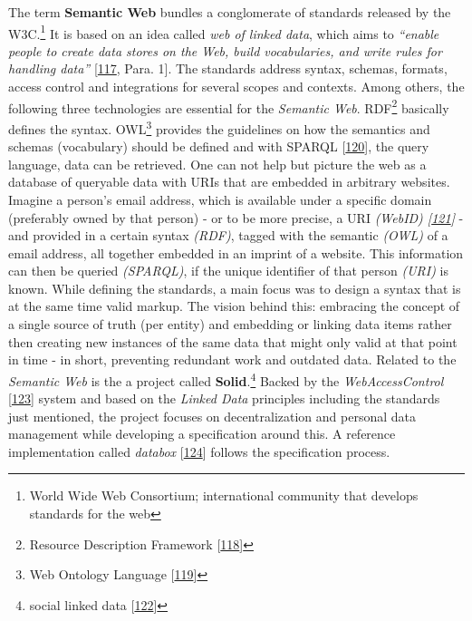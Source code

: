 \documentclass[12pt,english,a4paper,titlepage,cleardoublepage=empty,dottedtoc]{report}
\begin{document}
The term \textbf{\protect\hypertarget{def--semantic-web}{}{Semantic
Web}} bundles a conglomerate of standards released by the W3C.\footnote{World
  Wide Web Consortium; international community that develops standards
  for the web} It is based on an idea called \emph{web of linked data},
which aims to \emph{``enable people to create data stores on the Web,
build vocabularies, and write rules for handling data''}
{[}\protect\hyperlink{ref-web_2016_w3c_semantic-web-activity}{117},
Para. 1{]}. The standards address syntax, schemas, formats, access
control and integrations for several scopes and contexts. Among others,
the following three technologies are essential for the \emph{Semantic
Web}. RDF\footnote{Resource Description Framework
  {[}\protect\hyperlink{ref-web_w3c-tr_rdf}{118}{]}} basically defines
the syntax. OWL\footnote{Web Ontology Language
  {[}\protect\hyperlink{ref-web_w3c-tr_owl}{119}{]}} provides the
guidelines on how the semantics and schemas (vocabulary) should be
defined and with \protect\hypertarget{def--sparql}{}{SPARQL}
{[}\protect\hyperlink{ref-web_w3c-tr_sparql}{120}{]}, the query
language, data can be retrieved. One can not help but picture the web as
a database of queryable data with URIs that are embedded in arbitrary
websites. Imagine a person's email address, which is available under a
specific domain (preferably owned by that person) - or to be more
precise, a URI \emph{(WebID)
{[}\protect\hyperlink{ref-web_w3c-draft_webid}{121}{]}} - and provided
in a certain syntax \emph{(RDF)}, tagged with the semantic \emph{(OWL)}
of a email address, all together embedded in an imprint of a website.
This information can then be queried \emph{(SPARQL)}, if the unique
identifier of that person \emph{(URI)} is known. While defining the
standards, a main focus was to design a syntax that is at the same time
valid markup. The vision behind this: embracing the concept of a single
source of truth (per entity) and embedding or linking data items rather
then creating new instances of the same data that might only valid at
that point in time - in short, preventing redundant work and outdated
data. Related to the \emph{Semantic Web} is the a project called
\textbf{Solid}.\footnote{social linked data
  {[}\protect\hyperlink{ref-web_spec_solid}{122}{]}} Backed by the
\emph{WebAccessControl}
{[}\protect\hyperlink{ref-web_2016_wiki_webaccesscontrol}{123}{]} system
and based on the \emph{Linked Data} principles including the standards
just mentioned, the project focuses on decentralization and personal
data management while developing a specification around this. A
reference implementation called \emph{databox}
{[}\protect\hyperlink{ref-web_2016_demo_databox}{124}{]} follows the
specification process.
\end{document}
